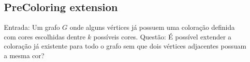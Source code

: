\subsection{PreColoring extension}
\begin{definition}
 Entrada: Um grafo $G$ onde alguns vértices já possuem uma coloração definida com cores escolhidas dentre $k$ possíveis cores.
 Questão: É possível extender a coloração já existente para todo o grafo sem que dois vértices adjacentes possuam a mesma cor? 
\end{definition}
